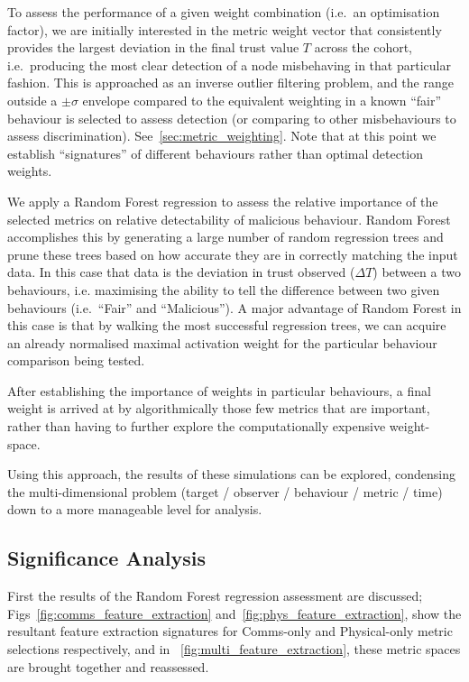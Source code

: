 To assess the performance of a given weight combination (i.e.\ an optimisation factor), we are initially interested in the metric weight vector that consistently provides the largest deviation in the final trust value $T$ across the cohort, i.e.\ producing the most clear detection of a node misbehaving in that particular fashion.
This is approached as an inverse outlier filtering problem, and the range outside a $\pm\sigma$ envelope compared to the equivalent weighting in a known ``fair'' behaviour is selected to assess detection (or comparing to other misbehaviours to assess discrimination).
See~\autoref{sec:metric_weighting}.
Note that at this point we establish ``signatures'' of different behaviours rather than optimal detection weights.

We apply a Random Forest regression \cite{Breiman2001} to assess the relative importance of the selected metrics on relative detectability of malicious behaviour. 
Random Forest accomplishes this by generating a large number of random regression trees and prune these trees based on how accurate they are in correctly matching the input data.
In this case that data is the deviation in trust observed ($\Delta T$) between a two behaviours, i.e. maximising the ability to tell the difference between two given behaviours (i.e.\ ``Fair'' and ``Malicious'').
A major advantage of Random Forest in this case is that by walking the most successful regression trees, we can acquire an already normalised maximal activation weight for the particular behaviour comparison being tested.

After establishing the importance of weights in particular behaviours, a final weight is arrived at by algorithmically those few metrics that are important, rather than having to further explore the computationally expensive weight-space.

Using this approach, the results of these simulations can be explored, condensing the multi-dimensional problem (target / observer / behaviour / metric / time) down to a more manageable level for analysis.

\subsection{Significance Analysis}

First the results of the Random Forest regression assessment are discussed; Figs~\ref{fig:comms_feature_extraction} and~\ref{fig:phys_feature_extraction}, show the resultant feature extraction signatures for Comms-only and Physical-only metric selections respectively, and in ~\autoref{fig:multi_feature_extraction}, these metric spaces are brought together and reassessed.

